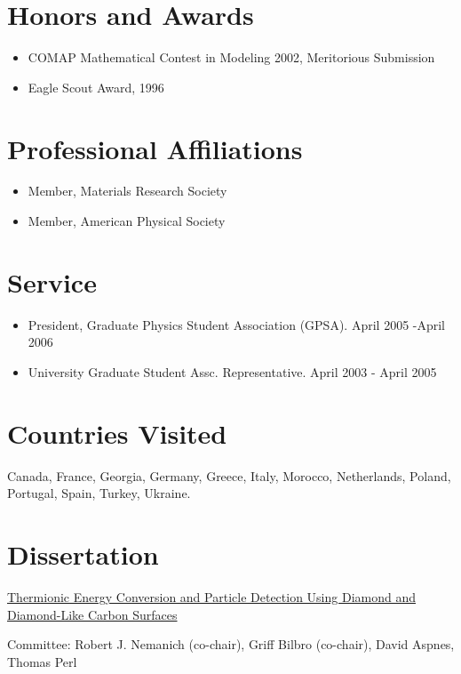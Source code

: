 \section{Honors and Awards}

\begin{itemize}
\tightlist
\item
  COMAP Mathematical Contest in Modeling 2002, Meritorious Submission
\item
  Eagle Scout Award, 1996
\end{itemize}

\section{Professional Affiliations}

\begin{itemize}
\tightlist
\item
  Member, Materials Research Society
\item
  Member, American Physical Society
\end{itemize}

\section{Service}

\begin{itemize}
\tightlist
\item
  President, Graduate Physics Student Association (GPSA). April 2005
  -April 2006
\item
  University Graduate Student Assc. Representative. April 2003 - April
  2005
\end{itemize}

\section{Countries Visited}

Canada, France, Georgia, Germany, Greece, Italy, Morocco, Netherlands,
Poland, Portugal, Spain, Turkey, Ukraine.

\section{Dissertation}

\href{http://www.lib.ncsu.edu/resolver/1840.16/3107}{Thermionic Energy
Conversion and Particle Detection Using Diamond and Diamond-Like Carbon
Surfaces}

Committee: Robert J. Nemanich (co-chair), Griff Bilbro (co-chair), David
Aspnes, Thomas Perl

